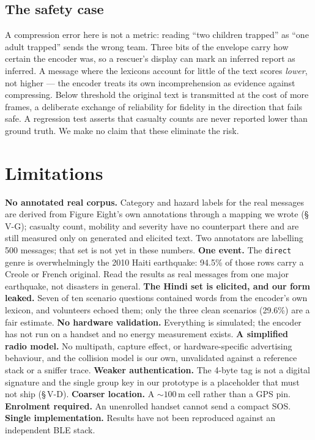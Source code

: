 \documentclass[conference]{IEEEtran}
\begin{document}
\subsection{The safety case}
A compression error here is not a metric: reading ``two children trapped'' as
``one adult trapped'' sends the wrong team. Three bits of the envelope carry
how certain the encoder was, so a rescuer's display can mark an inferred report
as inferred. A message where the lexicons account for little of the text scores
\emph{lower}, not higher --- the encoder treats its own incomprehension as
evidence against compressing. Below threshold the original text is transmitted
at the cost of more frames, a deliberate exchange of reliability for fidelity
in the direction that fails safe. A regression test asserts that casualty
counts are never reported lower than ground truth. We make no claim that these
eliminate the risk.

\section{Limitations}

\textbf{No annotated real corpus.} Category and hazard labels for the real
messages are derived from Figure Eight's own annotations through a mapping we
wrote (\S\,V-G); casualty count, mobility and severity have no counterpart
there and are still measured only on generated and elicited text. Two
annotators are labelling 500 messages; that set is not yet in these numbers.
\textbf{One event.} The \texttt{direct} genre is overwhelmingly the 2010
Haiti earthquake: 94.5\% of those rows carry a Creole or French original.
Read the results as real messages from one major earthquake, not disasters in
general. \textbf{The Hindi set is elicited, and our form leaked.} Seven of
ten scenario questions contained words from the encoder's own lexicon, and
volunteers echoed them; only the three clean scenarios (29.6\%) are a fair
estimate. \textbf{No hardware validation.} Everything is simulated; the
encoder has not run on a handset and no energy measurement exists.
\textbf{A simplified radio model.} No multipath, capture effect, or
hardware-specific advertising behaviour, and the collision model is our own,
unvalidated against a reference stack or a sniffer trace. \textbf{Weaker
authentication.} The 4-byte tag is not a digital signature and the single
group key in our prototype is a placeholder that must not ship (\S\,V-D).
\textbf{Coarser location.} A ${\sim}100$\,m cell rather than a GPS pin.
\textbf{Enrolment required.} An unenrolled handset cannot send a compact SOS.
\textbf{Single implementation.} Results have not been reproduced against an
independent BLE stack.
\end{document}

